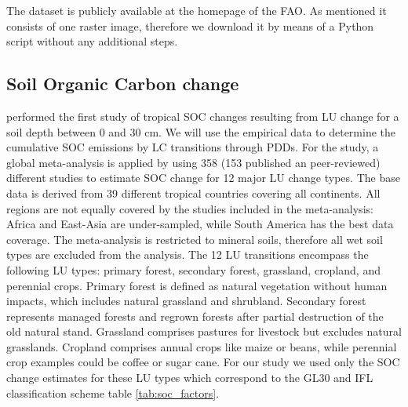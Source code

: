 		The dataset is publicly available at the homepage of the \ac{FAO}. As mentioned it consists of one raster image, therefore we download it by means of a Python script without any additional steps.

	\subsection{Soil Organic Carbon change}
		\citet{Don2010} performed the first study of tropical \ac{SOC} changes resulting from \ac{LU} change for a soil depth between 0 and 30 cm. We will use the empirical data to determine the cumulative \ac{SOC} emissions by \ac{LC} transitions through \acp{PDD}. For the study, a global meta-analysis is applied by using 358 (153 published an peer-reviewed) different studies to estimate \ac{SOC} change for 12 major \ac{LU} change types. The base data is derived from 39 different tropical countries covering all continents. All regions are not equally covered by the studies included in the meta-analysis: Africa and East-Asia are under-sampled, while South America has the best data coverage. The meta-analysis is restricted to mineral soils, therefore all wet soil types are excluded from the analysis. The 12 \ac{LU} transitions encompass the following \ac{LU} types: primary forest, secondary forest, grassland, cropland, and perennial crops. Primary forest is defined as natural vegetation without human impacts, which includes natural grassland and shrubland. Secondary forest represents managed forests and regrown forests after partial destruction of the old natural stand. Grassland comprises pastures for livestock but excludes natural grasslands. Cropland comprises annual crops like maize or beans, while perennial crop examples could be coffee or sugar cane. For our study we used only the \ac{SOC} change estimates for these \ac{LU} types which correspond to the \ac{GL30} and \ac{IFL} classification scheme table \ref{tab:soc_factors}.
